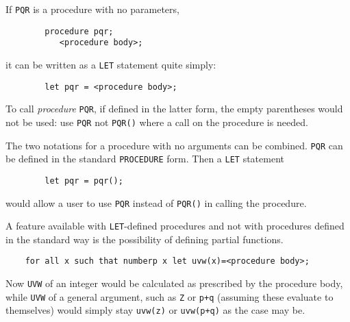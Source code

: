 If \texttt{PQR} is a procedure with no parameters,
\begin{verbatim}
        procedure pqr;
           <procedure body>;
\end{verbatim}
it can be written as a \texttt{LET} statement quite simply:
\begin{verbatim}
        let pqr = <procedure body>;
\end{verbatim}
To call \emph{procedure} \texttt{PQR}, if defined in the latter form, the empty
parentheses would not be used: use \texttt{PQR} not \texttt{PQR()} where a call
on the procedure is needed.

The two notations for a procedure with no arguments can be combined. \texttt{PQR}
can be defined in the standard \texttt{PROCEDURE} form. Then a \texttt{LET}
statement
\begin{verbatim}
        let pqr = pqr();
\end{verbatim}
would allow a user to use \texttt{PQR} instead of \texttt{PQR()} in calling the
procedure.

A feature available with \texttt{LET}-defined procedures and not with procedures
defined in the standard way is the possibility of defining partial
functions.
\begin{verbatim}
    for all x such that numberp x let uvw(x)=<procedure body>;
\end{verbatim}
Now \texttt{UVW} of an integer would be calculated as prescribed by the procedure
body, while \texttt{UVW} of a general argument, such as \texttt{Z} or \texttt{p+q}
(assuming these evaluate to themselves) would simply stay \texttt{uvw(z)}
or \texttt{uvw(p+q)} as the case may be.

